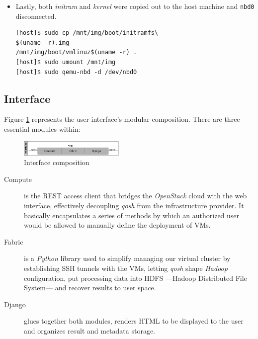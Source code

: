 \documentclass{sig-alternate}
\begin{document}
\begin{itemize}
\begin{verbatim}
[host]$ sudo qemu-nbd -c /dev/nbd0 \
compacted.qcow2
[host]$ sudo mount /dev/nbd0 /mnt/img
[host]$ sudo rm -f /mnt/img/root/zeros
   \end{verbatim}
   
 \item Lastly, both \emph{initram} and \emph{kernel} were copied out to the host machine and \texttt{nbd0} disconnected.
 
 \begin{verbatim}
[host]$ sudo cp /mnt/img/boot/initramfs\
$(uname -r).img
/mnt/img/boot/vmlinuz$(uname -r) .
[host]$ sudo umount /mnt/img
[host]$ sudo qemu-nbd -d /dev/nbd0
 \end{verbatim}

\end{itemize}



\subsection{Interface}
\noindent Figure \ref{fig:interface} represents the user interface's modular composition. There are three essential modules within:

\begin{figure}[tbp]
\centering
\includegraphics[width=0.45\textwidth]{img/003}
\caption{Interface composition}
\label{fig:interface}
\end{figure}

\begin{description}
 \item[Compute] is the REST access client that bridges the \emph{OpenStack} cloud with the web interface, effectively decoupling \emph{qosh} from the infrastructure provider. It basically encapsulates a series of methods by which an authorized user would be allowed to manually define the deployment of VMs.
 \item[Fabric] is a \emph{Python} library used to simplify managing our virtual cluster by establishing SSH tunnels with the VMs, letting \emph{qosh} shape \emph{Hadoop} configuration, put processing data into HDFS ---Hadoop Distributed File System--- and recover results to user space.
 \item[Django] glues together both modules, renders HTML to be displayed to the user and organizes result and metadata storage.
\end{description}
\end{document}
